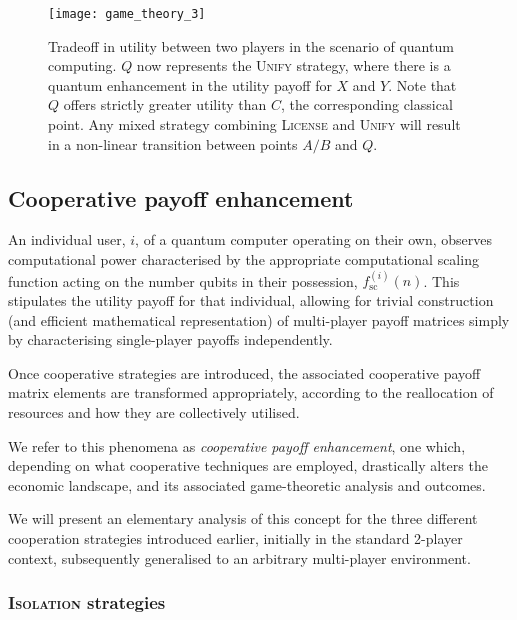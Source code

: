 \begin{figure}[!htbp]
\texttt{[image: game\_theory\_3]}
\captionspacefig \caption{Tradeoff in utility between two players in the scenario of quantum computing. $Q$ now represents the \textsc{Unify} strategy, where there is a quantum enhancement in the utility payoff for $X$ and $Y$. Note that $Q$ offers strictly greater utility than $C$, the corresponding classical point. Any mixed strategy combining \textsc{License} and \textsc{Unify} will result in a non-linear transition between points $A/B$ and $Q$.}\label{fig:game_theory_3}
\end{figure}

\subsection{Cooperative payoff enhancement}\label{sec:coop_enh}

An individual user, $i$, of a quantum computer operating on their own, observes computational power characterised by the appropriate computational scaling function acting on the number qubits in their possession, $f_\mathrm{sc}^{(i)}(n)$. This stipulates the utility payoff for that individual, allowing for trivial  construction (and efficient mathematical representation) of multi-player payoff matrices simply by characterising single-player payoffs independently.

Once cooperative strategies are introduced, the associated cooperative payoff matrix elements are transformed appropriately, according to the reallocation of resources and how they are collectively utilised.

We refer to this phenomena as \textit{cooperative payoff enhancement}, one which, depending on what cooperative techniques are employed, drastically alters the economic landscape, and its associated game-theoretic analysis and outcomes.

We will present an elementary analysis of this concept for the three different cooperation strategies introduced earlier, initially in the standard 2-player context, subsequently generalised to an arbitrary multi-player environment.

\subsubsection{\textsc{Isolation} strategies}

